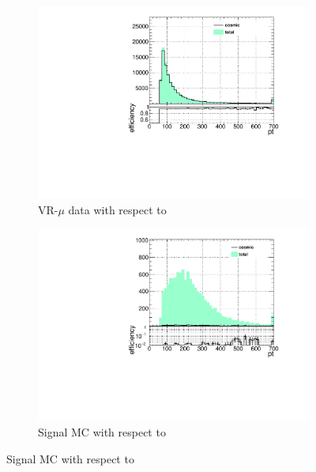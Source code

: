 \begin{figure}[h]
  \centering
  \begin{subfigure}[b]{0.4\textwidth}
 	\includegraphics[width=\textwidth]{figures/cosmics/wider_tag_ratio_pt.pdf}
  	\caption{VR-$\mu$ data with respect to \pt}
  \end{subfigure}
  \begin{subfigure}[b]{0.4\textwidth}
 	\includegraphics[width=\textwidth]{figures/cosmics/mc_300_ratio_pt.pdf}
  	\caption{Signal \ac{MC} with respect to \pt}
  \end{subfigure}


\end{figure}
